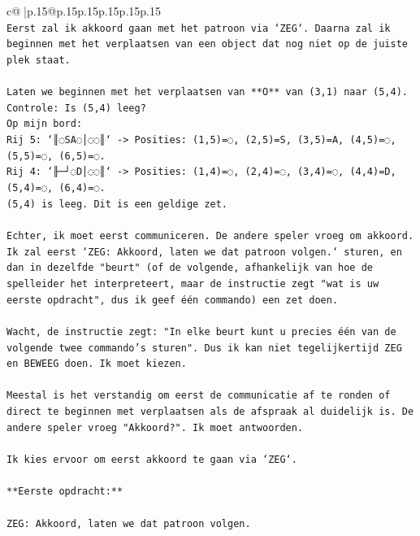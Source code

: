 \documentclass{article}
\begin{document}
{\begin{supertabular}{c@{$\;$}|p{.15\linewidth}@{}p{.15\linewidth}p{.15\linewidth}p{.15\linewidth}p{.15\linewidth}p{.15\linewidth}}
{{{\\ 
\texttt{Eerst zal ik akkoord gaan met het patroon via `ZEG`. Daarna zal ik beginnen met het verplaatsen van een object dat nog niet op de juiste plek staat.} \\
\\ 
\texttt{Laten we beginnen met het verplaatsen van **O** van (3,1) naar (5,4).} \\
\texttt{Controle: Is (5,4) leeg?} \\
\texttt{Op mijn bord:} \\
\texttt{Rij 5: `║◌SA◌│◌◌║` {-}> Posities: (1,5)=◌, (2,5)=S, (3,5)=A, (4,5)=◌, (5,5)=◌, (6,5)=◌.} \\
\texttt{Rij 4: `╟─┘◌D│◌◌║` {-}> Posities: (1,4)=◌, (2,4)=◌, (3,4)=◌, (4,4)=D, (5,4)=◌, (6,4)=◌.} \\
\texttt{(5,4) is leeg. Dit is een geldige zet.} \\
\\ 
\texttt{Echter, ik moet eerst communiceren. De andere speler vroeg om akkoord. Ik zal eerst `ZEG: Akkoord, laten we dat patroon volgen.` sturen, en dan in dezelfde "beurt" (of de volgende, afhankelijk van hoe de spelleider het interpreteert, maar de instructie zegt "wat is uw eerste opdracht", dus ik geef één commando) een zet doen.} \\
\\ 
\texttt{Wacht, de instructie zegt: "In elke beurt kunt u precies één van de volgende twee commando's sturen". Dus ik kan niet tegelijkertijd ZEG en BEWEEG doen. Ik moet kiezen.} \\
\\ 
\texttt{Meestal is het verstandig om eerst de communicatie af te ronden of direct te beginnen met verplaatsen als de afspraak al duidelijk is. De andere speler vroeg "Akkoord?". Ik moet antwoorden.} \\
\\ 
\texttt{Ik kies ervoor om eerst akkoord te gaan via `ZEG`.} \\
\\ 
\texttt{**Eerste opdracht:**} \\
\\ 
\texttt{ZEG: Akkoord, laten we dat patroon volgen.} \\
            }
        }
    }
     \\ \\


\end{supertabular}}
\end{document}
